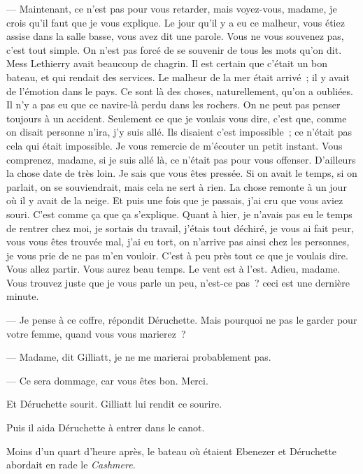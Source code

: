 \documentclass[french,twoside]{book} %
\begin{document}
— Maintenant, ce n’est pas pour vous retarder, mais voyez-vous, madame, je crois qu’il faut que je vous explique. Le jour qu’il y a eu ce malheur, vous étiez assise dans la salle basse, vous avez dit une parole. Vous ne vous souvenez pas, c’est tout simple. On n’est pas forcé de se souvenir de tous les mots qu’on dit. Mess Lethierry avait beaucoup de chagrin. Il est certain que c’était un bon bateau, et qui rendait des services. Le malheur de la mer était arrivé ; il y avait de l’émotion dans le pays. Ce sont là des choses, naturellement, qu’on a oubliées. Il n’y a pas eu que ce navire-là perdu dans les rochers. On ne peut pas penser toujours à un accident. Seulement ce que je voulais vous dire, c’est que, comme on disait personne n’ira, j’y suis allé. Ils disaient c’est impossible ; ce n’était pas cela qui était impossible. Je vous remercie de m’écouter un petit instant. Vous comprenez, madame, si je suis allé là, ce n’était pas pour vous offenser. D’ailleurs la chose date de très loin. Je sais que vous êtes pressée. Si on avait le temps, si on parlait, on se souviendrait, mais cela ne sert à rien. La chose remonte à un jour où il y avait de la neige. Et puis une fois que je passais, j’ai cru que vous aviez souri. C’est comme ça que ça s’explique. Quant à hier, je n’avais pas eu le temps de rentrer chez moi, je sortais du travail, j’étais tout déchiré, je vous ai fait peur, vous vous êtes trouvée mal, j’ai eu tort, on n’arrive pas ainsi chez les personnes, je vous prie de ne pas m’en vouloir. C’est à peu près  tout ce que je voulais dire. Vous allez partir. Vous aurez beau temps. Le vent est à l’est. Adieu, madame. Vous trouvez juste que je vous parle un peu, n’est-ce pas ? ceci est une dernière minute.\par
— Je pense à ce coffre, répondit Déruchette. Mais pourquoi ne pas le garder pour votre femme, quand vous vous marierez ?\par
— Madame, dit Gilliatt, je ne me marierai probablement pas.\par
— Ce sera dommage, car vous êtes bon. Merci.\par
Et Déruchette sourit. Gilliatt lui rendit ce sourire.\par
Puis il aida Déruchette à entrer dans le canot.\par
Moins d’un quart d’heure après, le bateau où étaient Ebenezer et Déruchette abordait en rade le \emph{Cashmere.}
\end{document}
